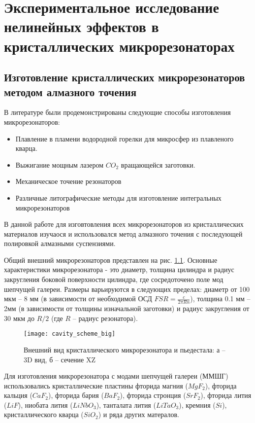 \chapter{Экспериментальное исследование нелинейных эффектов в кристаллических микрорезонаторах} \label{chapt3}

\section{Изготовление кристаллических микрорезонаторов методом алмазного точения}

В литературе были продемонстрированы следующие способы изготовления микрорезонаторов:

\begin{itemize}
  \item Плавление в пламени водородной горелки для микросфер из плавленого кварца.
  \item Выжигание мощным лазером $CO_2$ вращающейся заготовки.
  \item Механическое точение резонаторов
  \item Различные литографические методы для изготовление интегральных микрорезонаторов
\end{itemize}

В данной работе для изговтовления всех микрорезонаторов из кристаллических материалов изучаося и использовался метод алмазного точения с последующей полировкой алмазными суспензиями.

Общий внешний микрорезонаторов представлен на рис. \ref{cavity_scheme_big}. Основные характеристики микрорезонатора - это диаметр, толщина цилиндра и радиус закругления боковой поверхности цилиндра, где сосредоточено поле мод шепчущей галереи.  Размеры варьируются в следующих пределах: диаметр от 100 мкм – 8 мм (в зависимости от необходимой ОСД $FSR= \frac{c}{2\pi Rn}$), толщина 0.1 мм – 2мм (в зависимости от толщины изначальной заготовки) и радиус закругления от 30 мкм до $R/2$ (где $R$ – радиус резонатора).

\begin{figure}[ht]
    \centering
  \texttt{[image: cavity\_scheme\_big]}
  \caption{Внешний вид кристаллического микрорезонатора и пьедестала: а – 3D вид, б – сечение XZ}
  \label{cavity_scheme_big}
\end{figure}

Для изготовления микрорезонатора с модами шепчущей галереи (ММШГ) использовались кристаллические пластины фторида магния ($MgF_2$), фторида кальция ($CaF_2$), фторида бария ($BaF_2$), фторида стронция ($SrF_2$), фторида лития ($LiF$), ниобата лития ($LiNbO_3$), танталата лития ($LiTaO_3$), кремния ($Si$), кристаллического кварца ($SiO_2$) и ряда других матералов.

